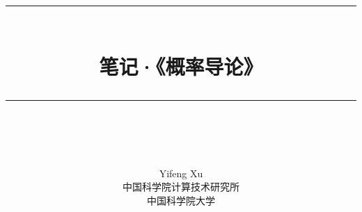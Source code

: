 \documentclass{article}
\theoremstyle{definition}
\theoremstyle{definition}
\theoremstyle{remark}
\begin{document}
\title{
    \rule{\linewidth}{2.0pt} \\
    \LARGE \textbf{\uppercase{笔记·《概率导论》}}
    \rule{\linewidth}{1.5pt} \\
    \vspace*{14\baselineskip}
}
\author{
    Yifeng Xu \\
    中国科学院计算技术研究所 \\
    中国科学院大学
}
\date{}

\maketitle \newpage

\nocite{*}
 \newpage
\tableofcontents \newpage
 \newpage
 \newpage
 \newpage
 \newpage
 \newpage
 \newpage

\appendix
 \newpage
 \newpage
 \newpage



\end{document}
